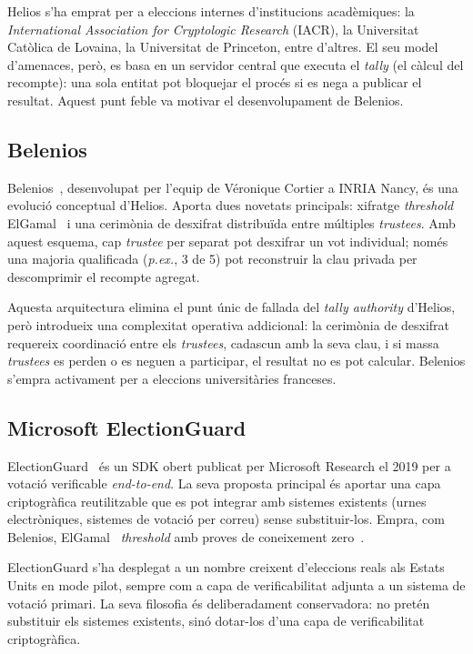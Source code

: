 Helios s'ha emprat per a eleccions internes d'institucions acadèmiques: la \emph{International Association for
Cryptologic Research} (IACR), la Universitat Catòlica de Lovaina, la Universitat de Princeton, entre d'altres.
El seu model d'amenaces, però, es basa en un servidor central que executa el \emph{tally} (el càlcul del recompte): una
sola entitat pot bloquejar el procés si es nega a publicar el resultat.
Aquest punt feble va motivar el desenvolupament de Belenios.

\subsection{Belenios}
\label{subsec:belenios}

Belenios~\cite{cortier2019belenios}, desenvolupat per l'equip de Véronique Cortier a INRIA Nancy, és una evolució
conceptual d'Helios.
Aporta dues novetats principals: xifratge \emph{threshold} ElGamal~\cite{elgamal1985public} i una cerimònia de desxifrat distribuïda entre
múltiples \emph{trustees}.
Amb aquest esquema, cap \emph{trustee} per separat pot desxifrar un vot individual; només una majoria qualificada
(\emph{p.ex.}, 3 de 5) pot reconstruir la clau privada per descomprimir el recompte agregat.

Aquesta arquitectura elimina el punt únic de fallada del \emph{tally authority} d'Helios, però introdueix una
complexitat operativa addicional: la cerimònia de desxifrat requereix coordinació entre els \emph{trustees}, cadascun
amb la seva clau, i si massa \emph{trustees} es perden o es neguen a participar, el resultat no es pot calcular.
Belenios s'empra activament per a eleccions universitàries franceses.

\subsection{Microsoft ElectionGuard}
\label{subsec:microsoft-electionguard}

ElectionGuard~\cite{microsoft2019electionguard} és un SDK obert publicat per Microsoft Research el 2019 per a votació
verificable \emph{end-to-end}.
La seva proposta principal és aportar una capa criptogràfica reutilitzable que es pot integrar amb sistemes existents
(urnes electròniques, sistemes de votació per correu) sense substituir-los.
Empra, com Belenios, ElGamal~\cite{elgamal1985public} \emph{threshold} amb proves de coneixement zero~\cite{goldwasser1989knowledge}.

ElectionGuard s'ha desplegat a un nombre creixent d'eleccions reals als Estats Units en mode pilot, sempre com a capa de
verificabilitat adjunta a un sistema de votació primari.
La seva filosofia és deliberadament conservadora: no pretén substituir els sistemes existents, sinó dotar-los d'una capa
de verificabilitat criptogràfica.

